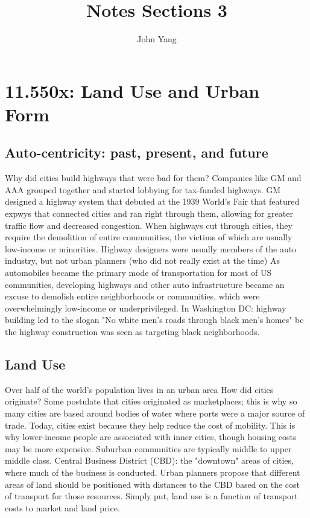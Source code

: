 \documentclass{article}
\title{Notes Sections 3} %
\author{John Yang}
\begin{document}
    \maketitle
    \tableofcontents
    \section{11.550x: Land Use and Urban Form}
    \subsection{Auto-centricity: past, present, and future}
    \begin{outline}
        \1 Why did cities build highways that were bad for them?
            \2 Companies like GM and AAA grouped together and started lobbying for tax-funded highways. 
            \2 GM designed a highway system that debuted at the 1939 World's Fair that featured expwys that connected cities and ran right through them, allowing for greater traffic flow and decreased congestion. 
            \2 When highways cut through cities, they require the demolition of entire communities, the victims of which are usually low-income or minorities. 
            \2 Highway designers were usually members of the auto industry, but not urban planners (who did not really exist at the time)
        \1 As automobiles became the primary mode of transportation for most of US communities, developing highways and other auto infrastructure became an excuse to demolish entire neighborhoods or communities, which were overwhelmingly low-income or underprivileged. 
        \1 In Washington DC: highway building led to the slogan "No white men's roads through black men's homes" bc the highway construction was seen as targeting black neighborhoods. 
    \end{outline}
    \subsection{Land Use}
    \begin{outline}
        \1 Over half of the world's population lives in an urban area
        \1 How did cities originate?
            \2 Some postulate that cities originated as marketplaces; this is why so many cities are based around bodies of water where ports were a major source of trade. 
        \1 Today, cities exist because they help reduce the cost of mobility. This is why lower-income people are associated with inner cities, though housing costs may be more expensive. Suburban communities are typically middle to upper middle class. 
        \1 Central Business District (CBD): the "downtown" areas of cities, where much of the business is conducted. Urban planners propose that different areas of land should be positioned with distances to the CBD based on the cost of transport for those resources. 
            \2 Simply put, land use is a function of transport costs to market and land price. 
        \1 %
    \end{outline}
\end{document}
